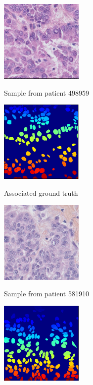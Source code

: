 \documentclass{article}
\begin{document}
\begin{figure}[htb]
\begin{minipage}[b]{.48\linewidth}
  \centering
  \centerline{\includegraphics[width=4.0cm]{RGB_1}}
  \centerline{Sample from patient 498959}\medskip
\end{minipage}
\hfill
\begin{minipage}[b]{0.48\linewidth}
  \centering
  \centerline{\includegraphics[width=4.0cm]{GT_1}}
  \centerline{Associated ground truth}\medskip
\end{minipage}
%
%
\begin{minipage}[b]{.48\linewidth}
  \centering
  \centerline{\includegraphics[width=4.0cm]{RGB_2}}
  \centerline{Sample from patient 581910}\medskip
\end{minipage}
\hfill
\begin{minipage}[b]{0.48\linewidth}
  \centering
  \centerline{\includegraphics[width=4.0cm]{GT_2}}

\end{minipage}
\end{figure}
\end{document}
